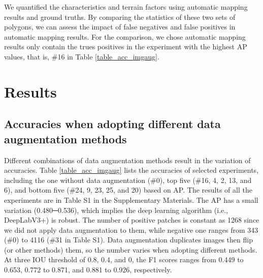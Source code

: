 \documentclass[preprint,12pt,authoryear]{elsarticle}
\begin{document}
We quantified the characteristics and terrain factors using automatic mapping results and ground truths. By comparing the statistics of these two sets of polygons, we can assess the impact of false negatives and false positives in automatic mapping results. For the comparison, we chose automatic mapping results only contain the trues positives in the experiment with the highest AP values, that is, \#16 in Table \ref{table_acc_imgaug}. 


\section{Results}
\label{sec_res}

\subsection{Accuracies when adopting different data augmentation methods}
\label{subsub_accuracies}
Different combinations of data augmentation methods result in the variation of accuracies.  Table \ref{table_acc_imgaug} lists the accuracies of selected experiments, including the one without data augmentation (\#0), top five (\#16, 4, 2, 13, and 6), and bottom five (\#24, 9, 23, 25, and 20) based on AP. The results of all the experiments are in Table S1 in the Supplementary Materials. The AP has a small variation (0.480─0.536), which implies the deep learning algorithm (i.e., DeepLabV3+) is robust. The number of positive patches is constant as 1268 since we did not apply data augmentation to them, while negative one ranges from 343 (\#0) to 4116 (\#31 in Table S1). Data augmentation duplicates images then flip (or other methods) them, so the number varies when adopting different methods. At three IOU threshold of 0.8, 0.4, and 0, the F1 scores ranges from 0.449 to 0.653, 0.772 to 0.871, and 0.881 to 0.926, respectively. 
\end{document}
